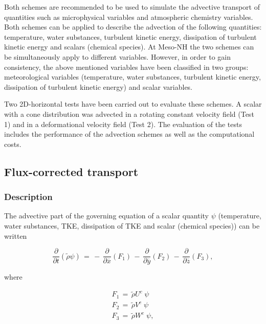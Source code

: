 Both schemes are recommended to be used to simulate the advective transport of
quantities such as
microphysical variables
and atmospheric chemistry variables. Both schemes can be applied to describe
the advection of the following quantities: temperature, water substances,
turbulent kinetic energy, dissipation of turbulent kinetic energy and scalars
(chemical species). At Meso-NH the two schemes can be simultaneously apply to
different variables. However, in order to gain consistency, the above mentioned variables
have been classified in two groups: meteorological variables (temperature, water substances,
turbulent kinetic energy, dissipation of turbulent kinetic energy) and scalar variables.

Two 2D-horizontal tests have been carried out to evaluate these schemes. A scalar with
a cone distribution was advected in a rotating constant velocity field (Test 1) and
in a deformational velocity field (Test 2). The evaluation of the tests includes the
performance of the advection schemes as well as the computational costs.

\subsection{Flux-corrected transport}

\subsubsection{Description}

The advective part of the governing equation of a scalar quantity $\psi$
(temperature, water substances, TKE, dissipation of TKE and scalar (chemical species))
can be written

\begin{equation}
\label{cond1}
\dfrac{\partial}{\partial t}(\tilde{\rho}\psi) \, =
 \, - \, \dfrac{\partial }{\partial \overline{x}} (F_1)
 \, - \, \dfrac{\partial }{\partial \overline{y}} (F_2)
 \, - \, \dfrac{\partial }{\partial \overline{z}} (F_3),
\end{equation}

\noindent where

\begin{eqnarray}
\label{cond2}
F_1\,=\,\tilde{\rho} U^{c} \;  \psi \\
F_2\,=\,\tilde{\rho} V^{c} \;  \psi \\
F_3\,=\,\tilde{\rho} W^{c} \;  \psi,
\end{eqnarray}

